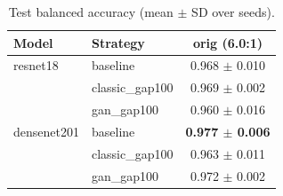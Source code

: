 \begin{table}[htbp]
\centering
\caption{Test balanced accuracy (mean $\pm$ SD over seeds).}
\label{tab:balanced_accuracy}
\begin{tabular}{llc}
\toprule
Model & Strategy & orig (6.0:1) \\
\midrule
resnet18 & baseline & 0.968 $\pm$ 0.010 \\
 & classic\_gap100 & 0.969 $\pm$ 0.002 \\
 & gan\_gap100 & 0.960 $\pm$ 0.016 \\
\addlinespace
densenet201 & baseline & \textbf{0.977 $\pm$ 0.006} \\
 & classic\_gap100 & 0.963 $\pm$ 0.011 \\
 & gan\_gap100 & 0.972 $\pm$ 0.002 \\
\bottomrule
\end{tabular}
\end{table}